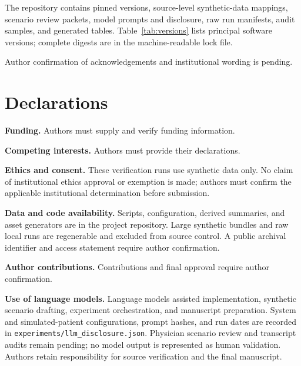 \backmatter
{}
The repository contains pinned versions, source-level synthetic-data mappings,
scenario review packets, model prompts and disclosure, raw run manifests,
audit samples, and generated tables. Table~\ref{tab:versions} lists principal
software versions; complete digests are in the machine-readable lock file.

\begin{table}[t]\centering
\caption{Principal pinned software versions. Model configurations and full
artifact digests accompany the experiment manifests.}
\label{tab:versions}\small

\end{table}

Author confirmation of acknowledgements and institutional wording is pending.

\section*{Declarations}
\textbf{Funding.} Authors must supply and verify funding information.\par
\textbf{Competing interests.} Authors must provide their declarations.\par
\textbf{Ethics and consent.} These verification runs use synthetic data only.
No claim of institutional ethics approval or exemption is made; authors must
confirm the applicable institutional determination before submission.\par
\textbf{Data and code availability.} Scripts, configuration, derived summaries,
and asset generators are in the project repository. Large synthetic bundles
and raw local runs are regenerable and excluded from source control. A public
archival identifier and access statement require author confirmation.\par
\textbf{Author contributions.} Contributions and final approval require author
confirmation.\par
\textbf{Use of language models.} Language models assisted implementation,
synthetic scenario drafting, experiment orchestration, and manuscript preparation.
System and simulated-patient configurations, prompt hashes, and run dates are
recorded in \texttt{experiments/llm\_disclosure.json}. Physician scenario review
and transcript audits remain pending; no model output is represented as human
validation. Authors retain responsibility for source verification and the final
manuscript.


